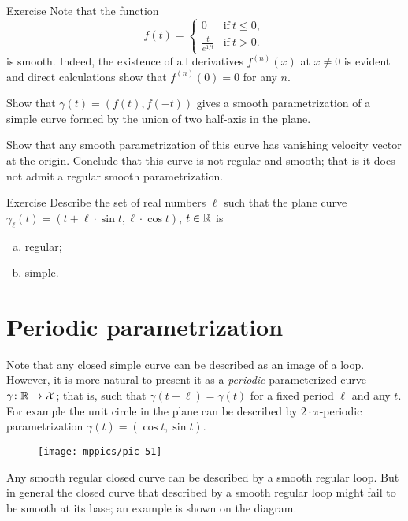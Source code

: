 \begin{thm}{Exercise}\label{ex:L-shape}
Note that the function 
\[f(t)=
\begin{cases}
0&\text{if}\ t\le 0,
\\
\frac{t}{e^{1\!/\!t}}&\text{if}\ t> 0.
\end{cases}
\]
is smooth. Indeed, the existence of all derivatives $f^{(n)}(x)$ at $x\ne 0$ is evident and direct calculations show that $f^{(n)}(0)=0$ for any $n$.

Show that $\gamma(t)=(f(t),f(-t))$ gives a smooth parametrization of a simple curve formed by the union of two half-axis in the plane.

Show that any smooth parametrization of this curve has vanishing velocity vector at the origin.
Conclude that this curve is not regular and smooth; that is it does not admit a regular smooth parametrization.
\end{thm}


\begin{thm}{Exercise}\label{ex:cycloid}
Describe the set of real numbers $\ell $
such that the plane curve $\gamma_\ell (t)= (t+\ell \cdot \sin t,\ell \cdot \cos t)$, $t\in\mathbb{R}$ is
\begin{enumerate}[(a)]
\item regular;
\item simple.
\end{enumerate}

\end{thm}

\section*{Periodic parametrization}
Note that any closed simple curve can be described as an image of a loop.
However, it is more natural to present it as a \emph{periodic} parameterized curve $\gamma\colon \mathbb{R}\to \mathcal{X}$; that is, such that $\gamma(t+\ell)=\gamma(t)$ for a fixed period $\ell$ and any $t$.
For example the unit circle in the plane can be described by $2{\cdot}\pi$-periodic parametrization $\gamma(t)=(\cos t,\sin t)$.

{

\begin{wrapfigure}{o}{17 mm}
\vskip-3mm
\centering
\texttt{[image: mppics/pic-51]}
\end{wrapfigure}

Any smooth regular closed curve can be described by a smooth regular loop.
But in general the closed curve that described by a smooth regular loop might fail to be smooth at its base; an example is shown on the diagram.

}

